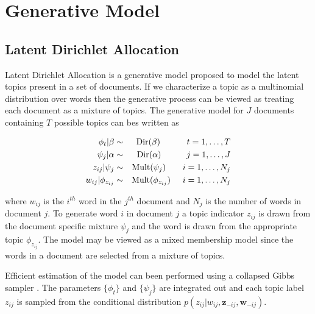\section{Generative Model}

\newcommand{\G}{\mathcal{G}}
\newcommand{\LM}{\mathcal{L}\mathcal{M}}
\newcommand{\bu}{{\bf u}}
\newcommand{\PY}{\mathcal{P}\mathcal{Y}}
\newcommand{\D}{\mathcal{D}}
\newcommand{\LA}{\mathcal{L}}

\subsection{Latent Dirichlet Allocation}

Latent Dirichlet Allocation \cite{Blei and Jordan} is a generative model proposed to model the latent topics present in a set of documents.  If we characterize a topic as a multinomial distribution over words then the generative process can be viewed as treating each document as a mixture of topics. The generative model for $J$ documents containing $T$ possible topics can bes written as 

\begin{eqnarray}
\phi_t | \beta  &\sim& \textrm{Dir}(\beta)  \hspace{1.1cm} t = 1,\ldots,T \nonumber \\
\psi_j | \alpha &\sim& \textrm{Dir}(\alpha) \hspace{1.05cm} j = 1,\ldots, J\nonumber \\
z_{ij} | \psi_j &\sim& \textrm{Mult}(\psi_j) \hspace{.7cm} i = 1,\ldots, N_j \nonumber \\
w_{ij} | \phi_{z_{ij}} &\sim& \textrm{Mult}(\phi_{z_{ij}}) \hspace{.5cm} i = 1,\ldots, N_j 
\end{eqnarray}

where $w_{ij}$ is the $i^{th}$ word in the $j^{th}$ document and $N_j$ is the number of words in document $j$. To generate word $i$ in document $j$ a topic indicator $z_{ij}$ is drawn from the document specific mixture $\psi_j$ and the word is drawn from the appropriate topic $\phi_{z_{ij}}$.  The model may be viewed as a mixed membership model since the words in a document are selected from a mixture of topics.

Efficient estimation of the model can been performed using a collapsed Gibbs sampler \cite{Griffiths2004}.  The parameters $\{ \phi_t \}$ and $\{ \psi_j \}$ are integrated out and each topic label $z_{ij}$ is sampled from the conditional distribution $p(z_{ij} | w_{ij}, \mathbf{z}_{-ij}, \mathbf{w}_{-ij})$.

